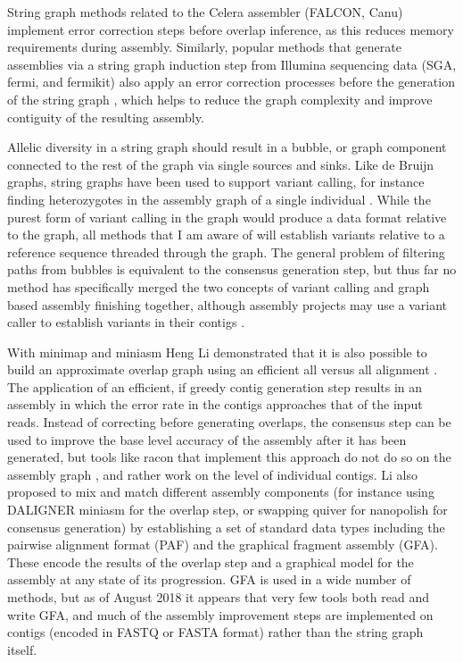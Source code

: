 String graph methods related to the Celera assembler (FALCON, Canu) implement error correction steps before overlap inference, as this reduces memory requirements during assembly.
Similarly, popular methods that generate assemblies via a string graph induction step from Illumina sequencing data (SGA, fermi, and fermikit) also apply an error correction processes before the generation of the string graph \cite{simpson2012efficient,simpson2014exploring,li2015fermikit}, which helps to reduce the graph complexity and improve contiguity of the resulting assembly.

Allelic diversity in a string graph should result in a bubble, or graph component connected to the rest of the graph via single sources and sinks.
Like de Bruijn graphs, string graphs have been used to support variant calling, for instance finding heterozygotes in the assembly graph of a single individual \cite{li2012exploring}.
While the purest form of variant calling in the graph would produce a data format relative to the graph, all methods that I am aware of will establish variants relative to a reference sequence threaded through the graph.
The general problem of filtering paths from bubbles is equivalent to the consensus generation step, but thus far no method has specifically merged the two concepts of variant calling and graph based assembly finishing together, although assembly projects may use a variant caller to establish variants in their contigs \cite{jain2018nanopore,schmid2018pushing}.

With minimap and miniasm Heng Li demonstrated that it is also possible to build an approximate overlap graph using an efficient all versus all alignment \cite{li2016minimap}.
The application of an efficient, if greedy contig generation step results in an assembly in which the error rate in the contigs approaches that of the input reads.
Instead of correcting before generating overlaps, the consensus step can be used to improve the base level accuracy of the assembly after it has been generated, but tools like racon that implement this approach do not do so on the assembly graph \cite{vaser2017fast}, and rather work on the level of individual contigs.
Li \cite{li2016minimap} also proposed to mix and match different assembly components (for instance using DALIGNER \cite{myers2014efficient} miniasm for the overlap step, or swapping quiver for nanopolish for consensus generation) by establishing a set of standard data types including the pairwise alignment format (PAF) and the graphical fragment assembly (GFA).
These encode the results of the overlap step and a graphical model for the assembly at any state of its progression.
GFA is used in a wide number of methods, but as of August 2018 it appears that very few tools both read and write GFA, and much of the assembly improvement steps are implemented on contigs (encoded in FASTQ or FASTA format) rather than the string graph itself.

